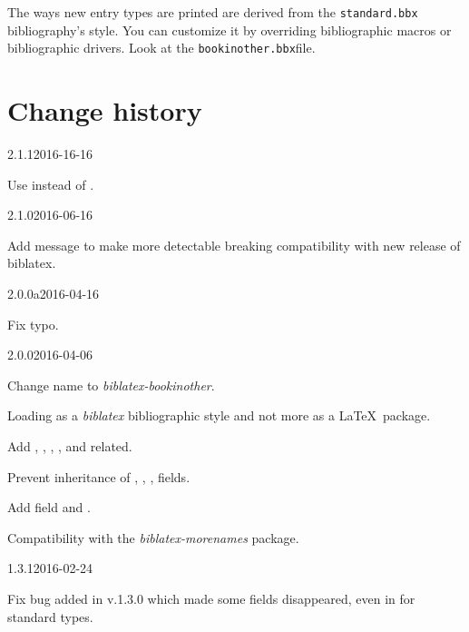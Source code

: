 \documentclass{ltxdockit}[2011/03/25]
\newcommand{\pkg}[1]{\emph{#1}}
\newcommand{\biblatex}{\emph{biblatex}\xspace}
\begin{document}
The ways new entry types are printed are derived from the \verb+standard.bbx+ bibliography's style. You can customize it by overriding bibliographic macros or bibliographic drivers. Look at the \verb+bookinother.bbx+file.

\section{Change history}


\begin{changelog}

\begin{release}{2.1.1}{2016-16-16}
  \item Use  instead of .
\end{release}

\begin{release}{2.1.0}{2016-06-16}
  \item Add message to make more detectable breaking compatibility with new release of biblatex.
\end{release}

\begin{release}{2.0.0a}{2016-04-16}
  \item Fix typo.
\end{release}

\begin{release}{2.0.0}{2016-04-06}
\item Change name to \pkg{biblatex-bookinother}.
\item Loading as a \biblatex bibliographic style and not more as a \LaTeX\ package.
\item Add , , , ,  and related.
\item Prevent inheritance of , , ,  fields.
\item Add field  and .
\item Compatibility with the \pkg{biblatex-morenames} package.
\end{release}

\begin{release}{1.3.1}{2016-02-24}
\item Fix bug added in v.1.3.0 which made some fields disappeared, even in for standard types.
\end{release}


\end{changelog}
\end{document}
